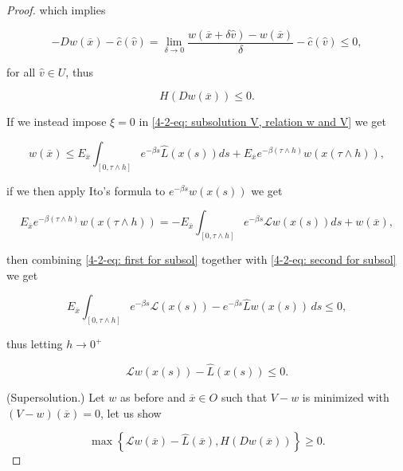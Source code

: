 \begin{theorem}
\begin{proof}
        which implies 

        \begin{equation}
            -Dw(\overline{x}) -\hat{c}(\hat{v}) = \lim_{\delta\to0} \frac{w(\overline{x} + \delta\hat{v}) - w(\overline{x})}{\delta} - \hat{c}(\hat{v}) \leq 0,
        \end{equation}

        for all $\hat{v}\in U$, thus

        \[H(Dw(\overline{x}))\leq 0.\]

        If we instead impose $\xi=0$ in \eqref{4-2-eq: subsolution V, relation w and V} we get
        
        \begin{equation}\label{4-2-eq: first for subsol}
            w(\overline{x}) \leq E_{\overline{x}} \int_{[0,\tau\land h]} e^{-\beta s}\hat{L}(x(s))ds + E_{\overline{x}}e^{-\beta(\tau\land h)}w(x(\tau\land h)),
        \end{equation}    
        
        if we then apply Ito's formula to $e^{-\beta s}w(x(s))$ we get 

        \begin{equation}\label{4-2-eq: second for subsol}
            E_{\overline{x}}e^{-\beta(\tau\land h)}w(x(\tau\land h)) = - E_{\overline{x}} \int_{[0,\tau\land h]} e^{-\beta s}\mathcal{L}w(x(s))ds + w(\overline{x}),
        \end{equation}

        then combining \eqref{4-2-eq: first for subsol} together with \eqref{4-2-eq: second for subsol} we get

        \begin{equation}
            E_{\overline{x}} \int_{[0,\tau\land h]} e^{-\beta s}\mathcal{L}(x(s)) - e^{-\beta s}\hat{L}w(x(s))\,ds\leq 0,  
        \end{equation}

        thus letting $h\to0^+$

        \begin{equation}
            \mathcal{L}w(x(s)) - \hat{L}(x(s))\leq 0.
        \end{equation}

        (Supersolution.) Let $w$ as before and $\overline{x}\in O$ such that $V-w$ is minimized with $(V-w)(\overline{x})=0$, let us show

        \begin{equation}
            \max\left\{\mathcal{L}w(\overline{x}) - \hat{L}(\overline{x}), H(Dw(\overline{x}))\right\} \geq 0.
        \end{equation}


\end{proof}
\end{theorem}

